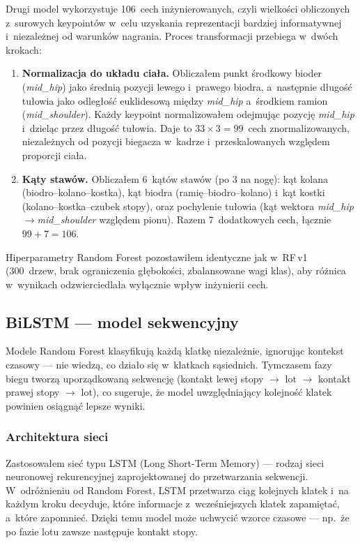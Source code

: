Drugi model wykorzystuje 106~cech inżynierowanych, czyli wielkości obliczonych z~surowych keypointów w~celu uzyskania reprezentacji bardziej informatywnej i~niezależnej od warunków nagrania. Proces transformacji przebiega w~dwóch krokach:

\begin{enumerate}
    \item \textbf{Normalizacja do układu ciała.} Obliczałem punkt środkowy bioder (\textit{mid\_hip}) jako średnią pozycji lewego i~prawego biodra, a~następnie długość tułowia jako odległość euklidesową między \textit{mid\_hip} a~środkiem ramion (\textit{mid\_shoulder}). Każdy keypoint normalizowałem odejmując pozycję \textit{mid\_hip} i~dzieląc przez długość tułowia. Daje to $33 \times 3 = 99$~cech znormalizowanych, niezależnych od pozycji biegacza w~kadrze i~przeskalowanych względem proporcji ciała.
    \item \textbf{Kąty stawów.} Obliczałem 6~kątów stawów (po 3 na nogę): kąt kolana (biodro--kolano--kostka), kąt biodra (ramię--biodro--kolano) i~kąt kostki (kolano--kostka--czubek stopy), oraz pochylenie tułowia (kąt wektora \textit{mid\_hip}$\to$\textit{mid\_shoulder} względem pionu). Razem 7~dodatkowych cech, łącznie $99 + 7 = 106$.
\end{enumerate}

Hiperparametry Random Forest pozostawiłem identyczne jak w~RF\,v1 (300~drzew, brak ograniczenia głębokości, zbalansowane wagi klas), aby różnica w~wynikach odzwierciedlała wyłącznie wpływ inżynierii cech.

\subsection{BiLSTM --- model sekwencyjny}
\label{sec:bilstm}

Modele Random Forest klasyfikują każdą klatkę niezależnie, ignorując kontekst czasowy --- nie wiedzą, co działo się w~klatkach sąsiednich. Tymczasem fazy biegu tworzą uporządkowaną sekwencję (kontakt lewej stopy $\to$ lot $\to$ kontakt prawej stopy $\to$ lot), co sugeruje, że model uwzględniający kolejność klatek powinien osiągnąć lepsze wyniki.

\subsubsection{Architektura sieci}

Zastosowałem sieć typu LSTM (Long Short-Term Memory) \cite{hochreiter1997lstm} --- rodzaj sieci neuronowej rekurencyjnej zaprojektowanej do przetwarzania sekwencji. W~odróżnieniu od Random Forest, LSTM przetwarza ciąg kolejnych klatek i~na każdym kroku decyduje, które informacje z~wcześniejszych klatek zapamiętać, a~które zapomnieć. Dzięki temu model może uchwycić wzorce czasowe --- np.~że po fazie lotu zawsze następuje kontakt stopy.

